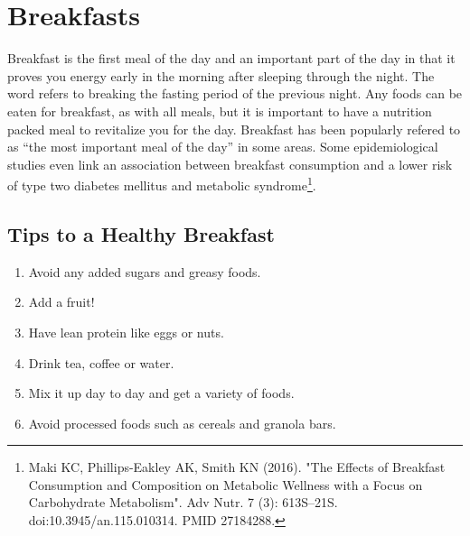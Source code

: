 \AddToShipoutPicture*{\driedfruit}
\chapter{Breakfasts}

Breakfast is the first meal of the day and an important part of the day in that it proves you energy early in the morning after sleeping through the night. The word refers to breaking the fasting period of the previous night. Any foods can be eaten for breakfast, as with all meals, but it is important to have a nutrition packed meal to revitalize you for the day. Breakfast has been popularly refered to as ``the most important meal of the day'' in some areas. Some epidemiological studies even link an association between breakfast consumption and a lower risk of type two diabetes mellitus and metabolic syndrome\footnote{Maki KC, Phillips-Eakley AK, Smith KN (2016). "The Effects of Breakfast Consumption and Composition on Metabolic Wellness with a Focus on Carbohydrate Metabolism". Adv Nutr. 7 (3): 613S–21S. doi:10.3945/an.115.010314. PMID 27184288.}.


\section*{Tips to a Healthy Breakfast}
\begin{enumerate}
	\item Avoid any added sugars and greasy foods.
	\item Add a fruit!
	\item Have lean protein like eggs or nuts.
	\item Drink tea, coffee or water.
	\item Mix it up day to day and get a variety of foods.
	\item Avoid processed foods such as cereals and granola bars.
\end{enumerate}